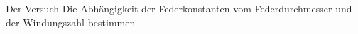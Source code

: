 \begin{frame}{Der Versuch}
    Die Abhängigkeit der Federkonstanten vom Federdurchmesser und der Windungszahl bestimmen
\end{frame}